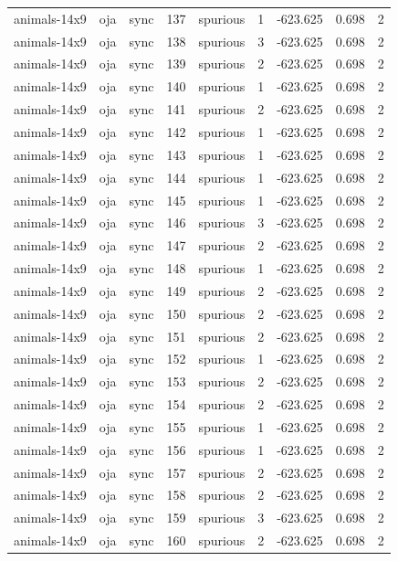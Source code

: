 \begin{tabular}{lllrlrrrr}
animals-14x9 & oja & sync & 137 & spurious & 1 & -623.625 & 0.698 & 2 \\
animals-14x9 & oja & sync & 138 & spurious & 3 & -623.625 & 0.698 & 2 \\
animals-14x9 & oja & sync & 139 & spurious & 2 & -623.625 & 0.698 & 2 \\
animals-14x9 & oja & sync & 140 & spurious & 1 & -623.625 & 0.698 & 2 \\
animals-14x9 & oja & sync & 141 & spurious & 2 & -623.625 & 0.698 & 2 \\
animals-14x9 & oja & sync & 142 & spurious & 1 & -623.625 & 0.698 & 2 \\
animals-14x9 & oja & sync & 143 & spurious & 1 & -623.625 & 0.698 & 2 \\
animals-14x9 & oja & sync & 144 & spurious & 1 & -623.625 & 0.698 & 2 \\
animals-14x9 & oja & sync & 145 & spurious & 1 & -623.625 & 0.698 & 2 \\
animals-14x9 & oja & sync & 146 & spurious & 3 & -623.625 & 0.698 & 2 \\
animals-14x9 & oja & sync & 147 & spurious & 2 & -623.625 & 0.698 & 2 \\
animals-14x9 & oja & sync & 148 & spurious & 1 & -623.625 & 0.698 & 2 \\
animals-14x9 & oja & sync & 149 & spurious & 2 & -623.625 & 0.698 & 2 \\
animals-14x9 & oja & sync & 150 & spurious & 2 & -623.625 & 0.698 & 2 \\
animals-14x9 & oja & sync & 151 & spurious & 2 & -623.625 & 0.698 & 2 \\
animals-14x9 & oja & sync & 152 & spurious & 1 & -623.625 & 0.698 & 2 \\
animals-14x9 & oja & sync & 153 & spurious & 2 & -623.625 & 0.698 & 2 \\
animals-14x9 & oja & sync & 154 & spurious & 2 & -623.625 & 0.698 & 2 \\
animals-14x9 & oja & sync & 155 & spurious & 1 & -623.625 & 0.698 & 2 \\
animals-14x9 & oja & sync & 156 & spurious & 1 & -623.625 & 0.698 & 2 \\
animals-14x9 & oja & sync & 157 & spurious & 2 & -623.625 & 0.698 & 2 \\
animals-14x9 & oja & sync & 158 & spurious & 2 & -623.625 & 0.698 & 2 \\
animals-14x9 & oja & sync & 159 & spurious & 3 & -623.625 & 0.698 & 2 \\
animals-14x9 & oja & sync & 160 & spurious & 2 & -623.625 & 0.698 & 2 \\

\end{tabular}
